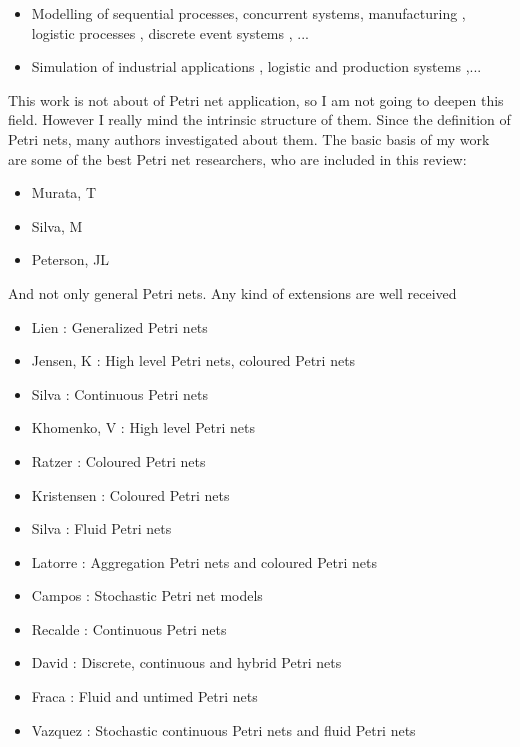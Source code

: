 \begin{itemize}
\item Modelling of sequential processes\cite{SM-Recalde1998267}, concurrent
systems\cite{EPN-SM-Jensen2007213,EPN-SM-Kristensen200819}, manufacturing \cite{G-Silva1989374,SM-Desrochers2010,SM-Silva19931,SM-Silva1997182,G-Silva201213}, logistic
processes \cite{SM-Guasch2002}, discrete event systems \cite{EPN-Balbo1998}, ...
\item Simulation of industrial applications \cite{SM-Jimenez2006159,SM-Latorre2013346}, logistic and production systems \cite{SM-Jimenez2004143},...
\end{itemize} 

This work is not about of Petri net application, so I am not
going to deepen this field. 
However I really mind the intrinsic structure of them. Since the definition
of Petri nets,
many authors investigated about them. The basic basis of my work are some of the best Petri net researchers, who are included in this review:
\begin{itemize}
\item Murata, T \cite{G-Murata1977412,G-SM-Murata19772,G-Murata1989541}
\item Silva, M \cite{G-Silva1985,G-Silva1993,G-Silva201213}
\item Peterson, JL \cite{G-EPN-Peterson1981}
\end{itemize} 



And not only general Petri nets. Any kind of extensions are well received
\begin{itemize}
\item Lien \cite{EPN-Lien1976251}: Generalized Petri nets
\item Jensen, K \cite{G-EPN-Jensen1985723,EPN-SM-Jensen2007213,EPN-Jensen2009}: High level
Petri nets, coloured Petri nets
\item Silva \cite{EPN-PROP-Silva2002314,EPN-SM-Silva2011427}: Continuous Petri nets 
\item Khomenko, V \cite{G-SM-Khomenko2003458}: High level Petri nets
\item Ratzer \cite{EPN-PROP-Ratzer2003450}: Coloured Petri nets
\item Kristensen \cite{EPN-Kristensen2004626,EPN-SM-Kristensen200819}: Coloured Petri nets
\item Silva \cite{EPN-Silva2004253}: Fluid Petri nets
\item Latorre \cite{EPN-SM-Latorre2010152,EPN-SM-Latorre2010247}: Aggregation Petri nets and coloured Petri nets
\item Campos \cite{EPN-Campos1992352}: Stochastic Petri net models
\item Recalde \cite{EPN-Recalde2010235}: Continuous Petri nets
\item David \cite{EPN-David2010}: Discrete, continuous and hybrid Petri nets
\item Fraca \cite{EPN-Fraca201221}: Fluid and untimed Petri nets
\item Vazquez \cite{EPN-Vazquez2012641,EPN-Vazquez2013365}: Stochastic continuous
Petri nets and fluid Petri nets
\end{itemize}

